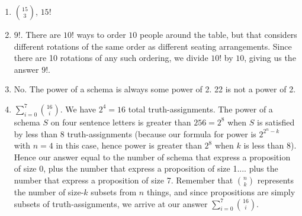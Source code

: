\begin{mdframed}[linewidth=1]
\begin{enumerate}
    \item $\binom{15}{3}$, $15!$

    \item $9!$. There are $10!$ ways to order $10$ people around the table, but that considers different rotations of the same order as different seating arrangements. Since there are 10 rotations of any such ordering, we divide $10!$ by $10$, giving us the answer $9!$.

    \item No. The power of a schema is always some power of 2. 22 is not a power of 2. 

    \item $\sum_{i = 0}^7\binom{16}{i}$. We have $2^4 = 16$ total truth-assignments. The power of a schema $S$ on four sentence letters is greater than $256 = 2^8$ when $S$ is satisfied by less than $8$ truth-assignments (because our formula for power is $2^{2^n - k}$ with $n=4$ in this case, hence power is greater than $2^8$ when $k$ is less than 8). Hence our answer equal to the number of schema that express a proposition of size 0, plus the number that express a proposition of size 1.... plus the number that express a proposition of size 7. Remember that $\binom{n}{k}$ represents the number of size-$k$ subsets from $n$ things, and since propositions are simply subsets of truth-assignments, we arrive at our answer $\sum_{i = 0}^7\binom{16}{i}$.

\end{enumerate}
\end{mdframed}
